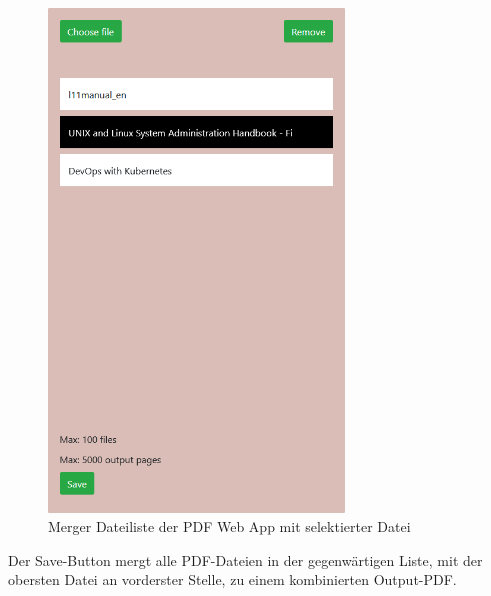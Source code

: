 \begin{figure}[!htbp]
	\centering
	\includegraphics[width=0.7\textwidth]{"images/mergelist.png"}
	\caption{Merger Dateiliste der PDF Web App mit selektierter Datei}
	\label{fig:mergelist}
\end{figure}

Der Save-Button mergt alle PDF-Dateien in der gegenwärtigen Liste, mit der obersten Datei an vorderster Stelle, zu einem kombinierten Output-PDF.

